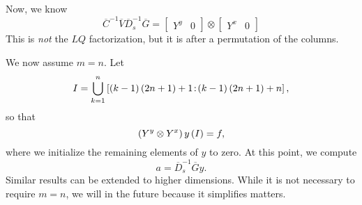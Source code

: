 Now, we know
%
\begin{equation}
    \overline{C}^{-1}\overline{V}\overline{D}_{s}^{-1}\overline{G}
        = \begin{bmatrix} Y^{y} & 0 \end{bmatrix}
            \otimes \begin{bmatrix} Y^{x} & 0 \end{bmatrix}
\end{equation}
%
This is \emph{not} the $LQ$ factorization, but it is after
a permutation of the columns.

We now assume $m=n$.
Let
%
\begin{equation}
    I = \bigcup_{k=1}^{n}
        \left[ \left( k-1 \right)\left( 2n+1 \right)+1\!:\!\left( k-1 \right)\left( 2n+1 \right)+n \right],
\end{equation}
%
so that
%
\begin{equation}
    \left( Y^{y}\otimes Y^{x} \right)y\left( I \right) = f,
\end{equation}
%
where we initialize the remaining elements of $y$ to zero.
At this point, we compute
%
\begin{equation}
    a = \overline{D}_{s}^{-1}\overline{G}y.
\end{equation}
%
Similar results can be extended to higher dimensions.
While it is not necessary to require $m=n$, we will in the future
because it simplifies matters.



